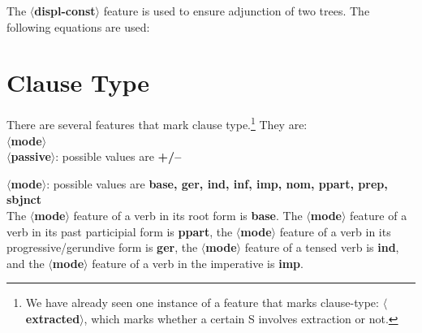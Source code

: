%
The {\bf $\langle$displ-const$\rangle$} feature is used to ensure
adjunction of two trees.
The following equations are used:



\section{Clause Type}
There are several features that mark clause type.\footnote{We have
already seen one instance of a feature that marks clause-type: {\bf
$\langle$extracted$\rangle$}, which marks whether a certain S involves
extraction or not.} They are:\\ {\bf $\langle$mode$\rangle$}\\ 
{\bf $\langle$passive$\rangle$}: possible values are {\bf +/--}

\noindent
{\bf $\langle$mode$\rangle$}: possible values are 
{\bf base, ger, ind, inf, imp, nom, ppart, prep, sbjnct}\\
The {\bf $\langle$mode$\rangle$} feature of a verb in its root form is
{\bf base}. The {\bf $\langle$mode$\rangle$} feature of a verb in its past 
participial form is {\bf ppart}, the {\bf $\langle$mode$\rangle$} feature of a 
verb in its progressive/gerundive form is {\bf ger}, 
the {\bf $\langle$mode$\rangle$} feature of a tensed verb is {\bf ind},
and the {\bf $\langle$mode$\rangle$} feature of a verb in the imperative 
is {\bf imp}. 

